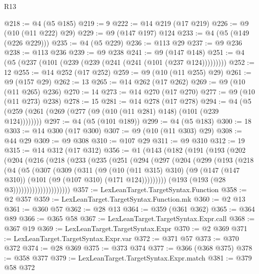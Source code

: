 \begin{lexlean}{R13}
\begin{coremodule}
{{{{{{{{{{{{{{{{{{{{{{{{{{{{{{{{{{{{{{{{{{{{{{{{{{{{{{@218 := @4 (@5 @185)
@219 := 9
@222 := @14 @219 (@17 @219)
@226 := @9 (@10 (@11 @222) @29)
@229 := @9 (@147 @197) @124
@233 := @4 (@5 (@149 (@226 @229)))
@235 := @4 (@5 @229)
@236 := @113 @29
@237 := @9 @236
@238 := @113 @236
@239 := @9 @238
@241 := @9 (@147 @148)
@251 := @4 (@5 (@237 (@101 (@239 (@239 (@241 (@241 (@101 (@237 @124)))))))))
@252 := 12
@255 := @14 @252 (@17 @252)
@259 := @9 (@10 (@11 @255) @29)
@261 := @9 (@157 @29)
@262 := 13
@265 := @14 @262 (@17 @262)
@269 := @9 (@10 (@11 @265) @236)
@270 := 14
@273 := @14 @270 (@17 @270)
@277 := @9 (@10 (@11 @273) @238)
@278 := 15
@281 := @14 @278 (@17 @278)
@294 := @4 (@5 (@259 (@261 (@269 (@277 (@9 (@10 (@11 @281) @148) (@101 (@239 @124))))))))
@297 := @4 (@5 (@101 @189))
@299 := @4 (@5 @183)
@300 := 18
@303 := @14 @300 (@17 @300)
@307 := @9 (@10 (@11 @303) @29)
@308 := @44 @29
@309 := @9 @308
@310 := @107 @29
@311 := @9 @310
@312 := 19
@315 := @14 @312 (@17 @312)
@356 := @1
    (@143
      (@182
        (@191
          (@193
            (@202
              (@204
                (@216
                  (@218
                    (@233
                      (@235
                        (@251
                          (@294
                            (@297
                              (@204
                                (@299
                                  (@193
                                    (@218
                                      (@4
                                        (@5
                                          (@307
                                            (@309
                                              (@311
                                                (@9
                                                  (@10 (@11 @315) @310)
                                                  (@9
                                                    (@147 (@147 @310))
                                                    (@101 (@9 (@107 @310) (@171 @124)))))))))
                                        (@193 (@193 (@28 @3)))))))))))))))))))))
@357 := LexLeanTarget.TargetSyntax.Function
@358 := @2 @357
@359 := LexLeanTarget.TargetSyntax.Function.mk
@360 := @2 @13
@361 := @360 @57
@362 := @28 @13
@364 := @359 (@361 @362)
@365 := @364 @89
@366 := @365 @58
@367 := LexLeanTarget.TargetSyntax.Expr.call
@368 := @367 @19
@369 := LexLeanTarget.TargetSyntax.Expr
@370 := @2 @369
@371 := LexLeanTarget.TargetSyntax.Expr.var
@372 := @371 @57
@373 := @370 @372
@374 := @28 @369
@375 := @373 @374
@377 := @366 (@368 @375)
@378 := @358 @377
@379 := LexLeanTarget.TargetSyntax.Expr.match
@381 := @379 @58 @372
}}}}}}}}}}}}}}}}}}}}}}}}}}}}}}}}}}}}}}}}}}}}}}}}}}}}}}
\end{coremodule}
\end{lexlean}
